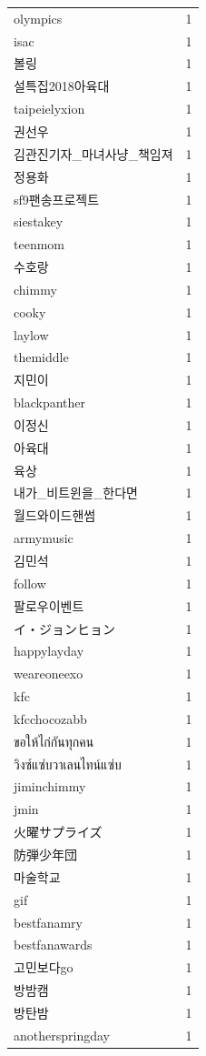 \begin{tabular}{lr}
olympics & 1 \\
isac & 1 \\
볼링 & 1 \\
설특집2018아육대 & 1 \\
taipeielyxion & 1 \\
권선우 & 1 \\
김관진기자\_마녀사냥\_책임져 & 1 \\
정용화 & 1 \\
sf9팬송프로젝트 & 1 \\
siestakey & 1 \\
teenmom & 1 \\
수호랑 & 1 \\
chimmy & 1 \\
cooky & 1 \\
laylow & 1 \\
themiddle & 1 \\
지민이 & 1 \\
blackpanther & 1 \\
이정신 & 1 \\
아육대 & 1 \\
육상 & 1 \\
내가\_비트윈을\_한다면 & 1 \\
월드와이드핸썸 & 1 \\
armymusic & 1 \\
김민석 & 1 \\
follow & 1 \\
팔로우이벤트 & 1 \\
イ・ジョンヒョン & 1 \\
happylayday & 1 \\
weareoneexo & 1 \\
kfc & 1 \\
kfcchocozabb & 1 \\
ขอให้ไก่กันทุกคน & 1 \\
วิงซ์แซ่บวาเลนไทน์แซ่บ & 1 \\
jiminchimmy & 1 \\
jmin & 1 \\
火曜サプライズ & 1 \\
防弾少年団 & 1 \\
마술학교 & 1 \\
gif & 1 \\
bestfanamry & 1 \\
bestfanawards & 1 \\
고민보다go & 1 \\
방밤캠 & 1 \\
방탄밤 & 1 \\
anotherspringday & 1 \\

\end{tabular}
